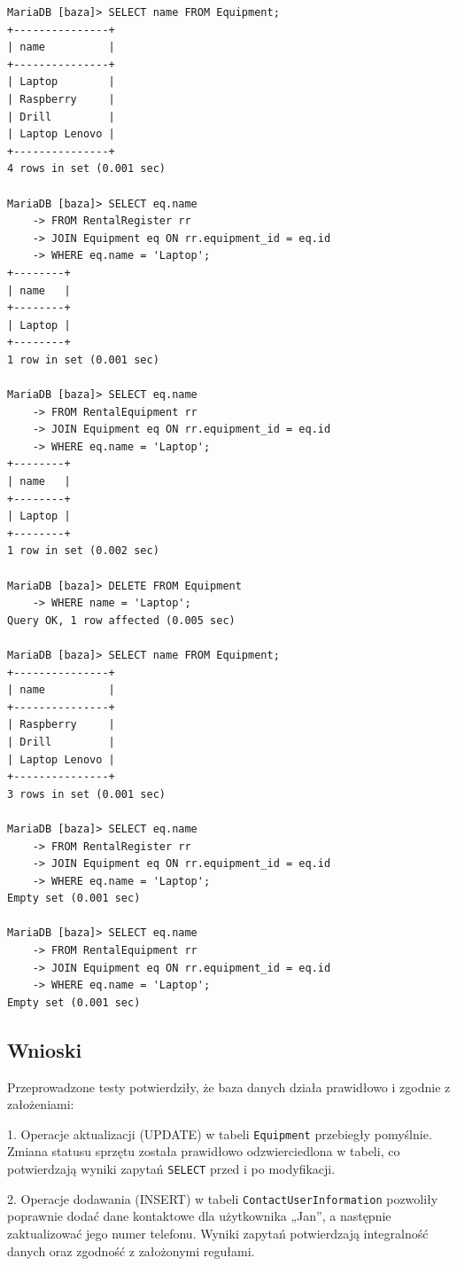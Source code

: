 \documentclass{article}
\begin{document}
\begin{verbatim}
MariaDB [baza]> SELECT name FROM Equipment;
+---------------+
| name          |
+---------------+
| Laptop        |
| Raspberry     |
| Drill         |
| Laptop Lenovo |
+---------------+
4 rows in set (0.001 sec)

MariaDB [baza]> SELECT eq.name 
    -> FROM RentalRegister rr 
    -> JOIN Equipment eq ON rr.equipment_id = eq.id 
    -> WHERE eq.name = 'Laptop';
+--------+
| name   |
+--------+
| Laptop |
+--------+
1 row in set (0.001 sec)

MariaDB [baza]> SELECT eq.name 
    -> FROM RentalEquipment rr 
    -> JOIN Equipment eq ON rr.equipment_id = eq.id 
    -> WHERE eq.name = 'Laptop';
+--------+
| name   |
+--------+
| Laptop |
+--------+
1 row in set (0.002 sec)

MariaDB [baza]> DELETE FROM Equipment
    -> WHERE name = 'Laptop';
Query OK, 1 row affected (0.005 sec)

MariaDB [baza]> SELECT name FROM Equipment;
+---------------+
| name          |
+---------------+
| Raspberry     |
| Drill         |
| Laptop Lenovo |
+---------------+
3 rows in set (0.001 sec)

MariaDB [baza]> SELECT eq.name 
    -> FROM RentalRegister rr 
    -> JOIN Equipment eq ON rr.equipment_id = eq.id 
    -> WHERE eq.name = 'Laptop';
Empty set (0.001 sec)

MariaDB [baza]> SELECT eq.name 
    -> FROM RentalEquipment rr 
    -> JOIN Equipment eq ON rr.equipment_id = eq.id 
    -> WHERE eq.name = 'Laptop';
Empty set (0.001 sec)
\end{verbatim}

\subsection{Wnioski}

Przeprowadzone testy potwierdziły, że baza danych działa prawidłowo i zgodnie z założeniami:

1. Operacje aktualizacji (UPDATE) w tabeli \texttt{Equipment} przebiegły pomyślnie. Zmiana statusu sprzętu została prawidłowo odzwierciedlona w tabeli, co potwierdzają wyniki zapytań \texttt{SELECT} przed i po modyfikacji.

2. Operacje dodawania (INSERT) w tabeli \texttt{ContactUserInformation} pozwoliły poprawnie dodać dane kontaktowe dla użytkownika „Jan”, a następnie zaktualizować jego numer telefonu. Wyniki zapytań potwierdzają integralność danych oraz zgodność z założonymi regułami.
\end{document}
